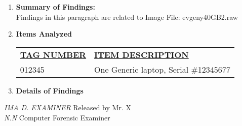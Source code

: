 \begin{enumerate}
\begin{itemize}
\begin{itemize}
		\end{itemize}
	
\end{itemize}


\item \textbf{Summary of Findings:}\\
Findings in this paragraph are related to Image File: evgeny\textunderscore 40GB\textunderscore 2.raw
\item \textbf{Items Analyzed}

\begin{longtable}{p{}p{}}
\textbf{\underline{TAG NUMBER}} & \textbf{\underline{ITEM DESCRIPTION}} \\
012345 & One Generic laptop, Serial \#12345677
\end{longtable}

\item \textbf{Details of Findings}

\end{enumerate}

\noindent \textit{IMA D. EXAMINER}	\hfill Released by {\wesa Mr. X}\\
\textit{N.N} Computer Forensic Examiner
\clearpage
